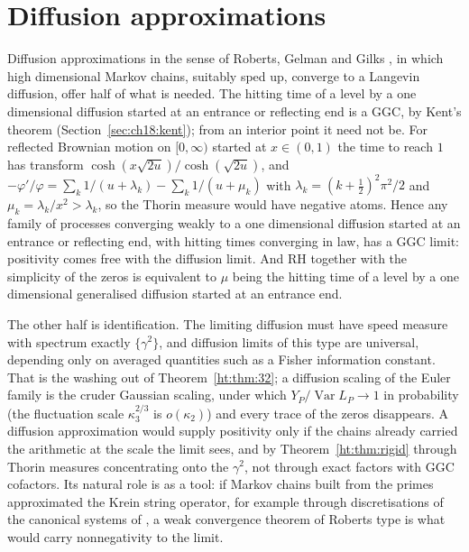 \section{Diffusion approximations}\label{ht:sec:diffusion}

Diffusion approximations in the sense of Roberts, Gelman and Gilks \cite{RGG97}, in which high dimensional Markov chains, suitably sped up, converge to a Langevin diffusion, offer half of what is needed. The hitting time of a level by a one dimensional diffusion started at an entrance or reflecting end is a GGC, by Kent's theorem \cite{Kent80} (Section~\ref{sec:ch18:kent}); from an interior point it need not be. For reflected Brownian motion on $[0,\infty)$ started at $x\in(0,1)$ the time to reach $1$ has transform $\cosh(x\sqrt{2u})/\cosh(\sqrt{2u})$, and $-\varphi'/\varphi=\sum_k1/(u+\lambda_k)-\sum_k1/(u+\mu_k)$ with $\lambda_k=(k+\frac12)^2\pi^2/2$ and $\mu_k=\lambda_k/x^2>\lambda_k$, so the Thorin measure would have negative atoms. Hence any family of processes converging weakly to a one dimensional diffusion started at an entrance or reflecting end, with hitting times converging in law, has a GGC limit: positivity comes free with the diffusion limit. And RH together with the simplicity of the zeros is equivalent to $\mu$ being the hitting time of a level by a one dimensional generalised diffusion started at an entrance end.

The other half is identification. The limiting diffusion must have speed measure with spectrum exactly $\{\gamma^2\}$, and diffusion limits of this type are universal, depending only on averaged quantities such as a Fisher information constant. That is the washing out of Theorem~\ref{ht:thm:32}; a diffusion scaling of the Euler family is the cruder Gaussian scaling, under which $Y_P/\operatorname{Var}L_P\to1$ in probability (the fluctuation scale $\kappa_3^{2/3}$ is $o(\kappa_2)$) and every trace of the zeros disappears. A diffusion approximation would supply positivity only if the chains already carried the arithmetic at the scale the limit sees, and by Theorem~\ref{ht:thm:rigid} through Thorin measures concentrating onto the $\gamma^2$, not through exact factors with GGC cofactors. Its natural role is as a tool: if Markov chains built from the primes approximated the Krein string operator, for example through discretisations of the canonical systems of \cite{Lagarias06}, a weak convergence theorem of Roberts type is what would carry nonnegativity to the limit.
